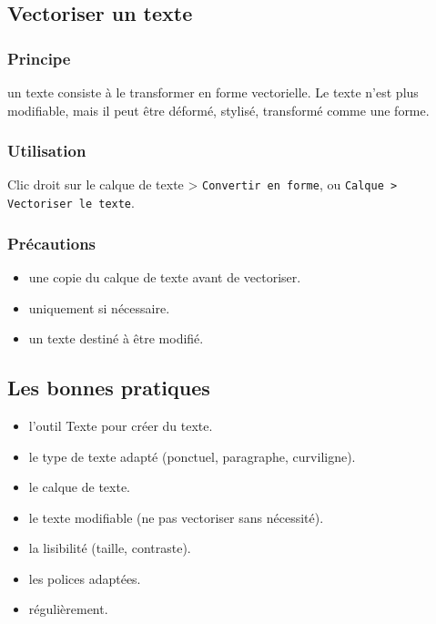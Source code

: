 \subsection{Vectoriser un texte}

\subsubsection{Principe}

 un texte consiste à le transformer en forme vectorielle. Le texte n'est plus modifiable, mais il peut être déformé, stylisé, transformé comme une forme.

\subsubsection{Utilisation}

Clic droit sur le calque de texte > \texttt{Convertir en forme}, ou \texttt{Calque > Vectoriser le texte}.

\subsubsection{Précautions}

\begin{itemize}
    \item {} une copie du calque de texte avant de vectoriser.
    \item {} uniquement si nécessaire.
    \item {} un texte destiné à être modifié.
\end{itemize}

\subsection{Les bonnes pratiques}

\begin{itemize}
    \item {} l'outil Texte pour créer du texte.
    \item {} le type de texte adapté (ponctuel, paragraphe, curviligne).
    \item {} le calque de texte.
    \item {} le texte modifiable (ne pas vectoriser sans nécessité).
    \item {} la lisibilité (taille, contraste).
    \item {} les polices adaptées.
    \item {} régulièrement.
\end{itemize}


